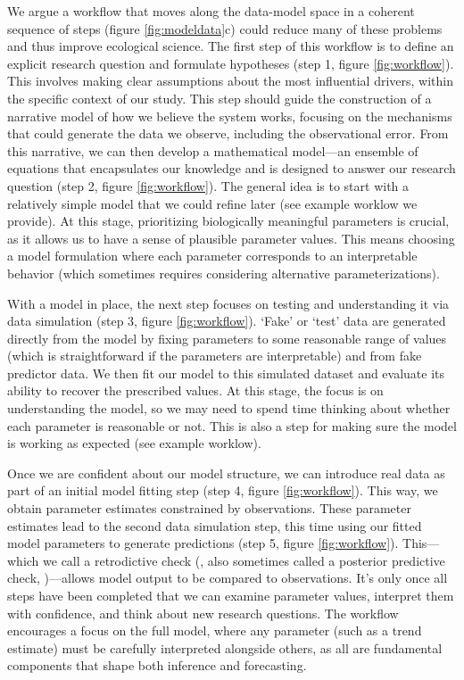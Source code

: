 \documentclass[11pt]{article}
\begin{document}
We argue a workflow that moves along the data-model space in a coherent sequence of steps (figure \ref{fig:modeldata}c) could reduce many of these problems and thus improve ecological science.
The first step of this workflow is to define an explicit research question and formulate hypotheses (step 1, figure \ref{fig:workflow}). This involves making clear assumptions about the most influential drivers, within the specific context of our study. This step should guide the construction of a narrative model of how we believe the system works, focusing on the mechanisms that could generate the data we observe, including the observational error. 
From this narrative, we can then develop a mathematical model---an ensemble of equations that encapsulates our knowledge and is designed to answer our research question (step 2, figure \ref{fig:workflow}). The general idea is to start with a relatively simple model that we could refine later (see example worklow we provide). At this stage, prioritizing biologically meaningful parameters is crucial, as it allows us to have a sense of plausible parameter values. This means choosing a model formulation where each parameter corresponds to an interpretable behavior (which sometimes requires considering alternative parameterizations). 

With a model in place, the next step focuses on testing and understanding it via data simulation (step 3, figure \ref{fig:workflow}). `Fake' or `test' data are generated directly from the model by fixing parameters to some reasonable range of values (which is straightforward if the parameters are interpretable) and from fake predictor data. 
We then fit our model to this simulated dataset and evaluate its ability to recover the prescribed values. At this stage, the focus is on understanding the model, so we may need to spend time thinking about whether each parameter is reasonable or not. This is also a step for making sure the model is working as expected (see example worklow). 

Once we are confident about our model structure, we can introduce real data as part of an initial model fitting step (step 4, figure \ref{fig:workflow}). This way, we obtain parameter estimates constrained by observations. 
These parameter estimates lead to the second data simulation step, this time using our fitted model parameters to generate predictions (step 5, figure \ref{fig:workflow}). This---which we call a retrodictive check (\citealp{betanworkflow}, also sometimes called a posterior predictive check, \citealp{Gelman2020})---allows model output to be compared to observations. 
It's only once all steps have been completed that we can examine parameter values, interpret them with confidence, and think about new research questions.
The workflow encourages a focus on the full model, where any parameter (such as a trend estimate) must be carefully interpreted alongside others, as all are fundamental components that shape both inference and forecasting. 
\end{document}
